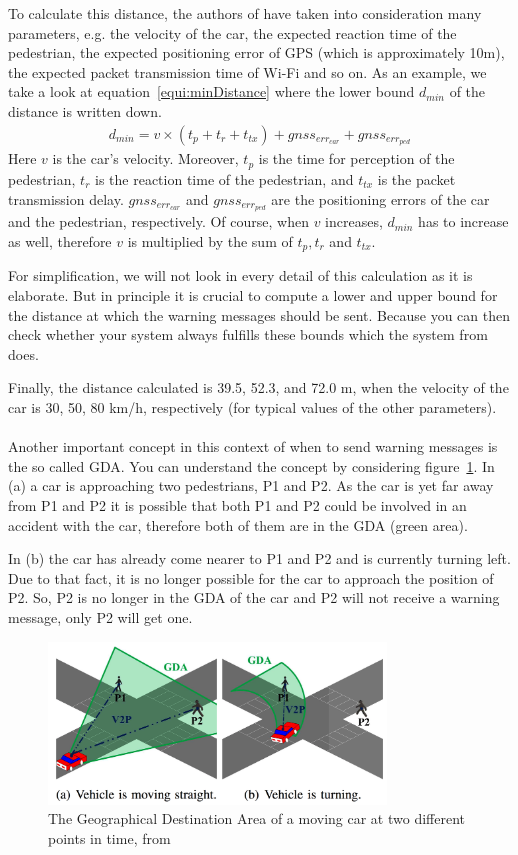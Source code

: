 \documentclass[]{ccs-thesis}
\begin{document}
To calculate this distance, the authors of \cite{v2pcomm} have taken into consideration many parameters, e.g. the velocity of the car, the expected reaction time of the pedestrian, the expected positioning error of GPS (which is approximately 10m), the expected packet transmission time of Wi-Fi and so on. As an example, we take a look at equation~\ref{equi:minDistance} where the lower bound $d_{min}$ of the distance is written down.
\begin{align}
d_{min}=v \times (t_p+t_r+t_{tx})+gnss_{err_{car}}+gnss_{err_{ped}}\label{equi:minDistance}
\end{align}
Here $v$ is the car's velocity. Moreover, $t_p$ is the time for perception of the pedestrian, $t_r$ is the reaction time of the pedestrian, and $t_{tx}$ is the packet transmission delay. $gnss_{err_{car}}$ and $gnss_{err_{ped}}$ are the positioning errors of the car and the pedestrian, respectively. Of course, when $v$ increases, $d_{min}$ has to increase as well, therefore $v$ is multiplied by the sum of $t_p, t_r$ and $t_{tx}$.

For simplification, we will not look in every detail of this calculation as it is elaborate. But in principle it is crucial to compute a lower and upper bound for the distance at which the warning messages should be sent. Because you can then check whether your system always fulfills these bounds which the system from \cite{v2pcomm} does.

Finally, the distance calculated is 39.5, 52.3, and 72.0 m, when the velocity of the car is 30, 50, 80 km/h, respectively (for typical values of the other parameters). \cite{v2pcomm}
\\\\
Another important concept in this context of when to send warning messages is the so called \ac{GDA}. You can understand the concept by considering figure~\ref{fig:gda}. In (a) a car is approaching two pedestrians, P1 and P2. As the car is yet far away from P1 and P2 it is possible that both P1 and P2 could be involved in an accident with the car, therefore both of them are in the \ac{GDA} (green area).

In (b) the car has already come nearer to P1 and P2 and is currently turning left. Due to that fact, it is no longer possible for the car to approach the position of P2. So, P2 is no longer in the \ac{GDA} of the car and P2 will not receive a warning message, only P2 will get one.

\begin{figure}[h]
	\centering
	\includegraphics[width=0.8\textwidth]{figures/5_gda}
	\caption{The Geographical Destination Area of a moving car at two different points in time, from \cite{v2pcomm}}%
	\label{fig:gda}%
\end{figure}
\end{document}
